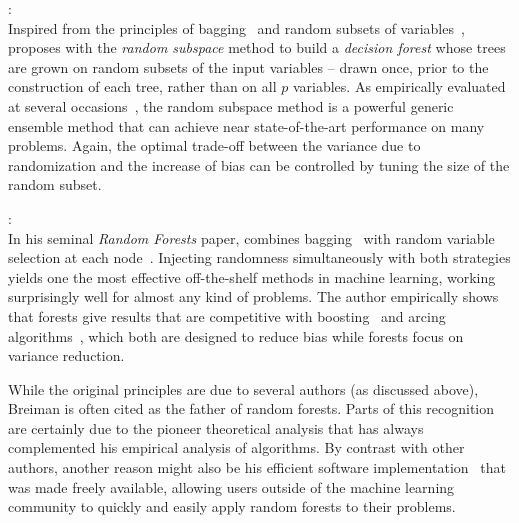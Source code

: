 \begin{description}
\item \citet{ho:1998}: \hfill \\
    Inspired from the principles of bagging~\citep{breiman:1996b} and
    random subsets of variables~\citep{amit:1997}, \citet{ho:1998} proposes
    with the \textit{random subspace} method to build a \textit{decision
    forest} whose trees are grown on random subsets of the input variables
    -- drawn once, prior to the construction of each tree, rather than on all $p$
    variables. As empirically evaluated at several
    occasions~\citep{ho:1998,panov:2007,louppe:2012}, the random subspace
    method is a powerful generic ensemble method that can achieve near state-of-the-art
    performance on many problems. Again, the optimal trade-off between the
    variance due to randomization  and the increase of bias can be controlled
    by tuning the size of the random subset.

\item \citet{breiman:2001}: \hfill \\
    In his seminal \textit{Random Forests} paper, \citet{breiman:2001} combines
    bagging~\citep{breiman:1996b} with random variable selection at each
    node~\citep{amit:1997}. Injecting randomness simultaneously with both strategies  yields
    one the most effective off-the-shelf methods in machine learning, working
    surprisingly well for almost any kind of problems. The author empirically
    shows that forests give results that are competitive with
    boosting~\citep{freund:1995} and arcing algorithms~\citep{breiman:1996},
    which both are designed to reduce bias while forests focus on variance
    reduction.

    While the original principles are due to several authors (as discussed
    above), Breiman is often cited as the father of random forests. Parts of
    this recognition are certainly due to the pioneer theoretical analysis that
    has always complemented his empirical analysis of algorithms. By contrast
    with other authors, another reason might also be his efficient software
    implementation~\citep{breiman:2002} that was made freely available,
    allowing users outside of the machine learning community to quickly and
    easily apply random forests to their problems.


\end{description}
